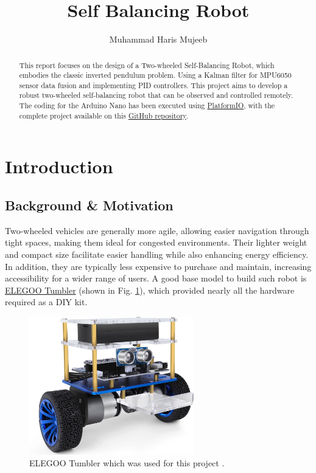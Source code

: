 \documentclass{article}
\title{Self Balancing Robot}
\author{Muhammad Haris Mujeeb}
\begin{document}
\maketitle

\begin{abstract}
This report focuses on the design of a Two-wheeled Self-Balancing Robot, which embodies the classic inverted pendulum problem. Using a Kalman filter for MPU6050 sensor data fusion and implementing PID controllers. This project aims to develop a robust two-wheeled self-balancing robot that can be observed and controlled remotely. The coding for the Arduino Nano has been executed using \href{https://platformio.org/}{PlatformIO}, with the complete project available on this \href{https://github.com/haris-mujeeb/Self-Balancing-Robot}{GitHub repository}.
\end{abstract}

\thispagestyle{empty}
\tableofcontents
\listoffigures
\listoftables
\newpage

\section{Introduction}
\subsection{Background \& Motivation}
Two-wheeled vehicles are generally more agile, allowing easier navigation through tight spaces, making them ideal for congested environments. Their lighter weight and compact size facilitate easier handling while also enhancing energy efficiency. In addition, they are typically less expensive to purchase and maintain, increasing accessibility for a wider range of users.
A good base model to build such robot is \href{https://www.elegoo.com/products/elegoo-tumbller-self-balancing-robot-car}{ELEGOO Tumbler} (shown in Fig. 
\ref{fig:tumbler}), which provided nearly all the hardware required as a DIY kit.
\begin{figure}[h]
    \centering
    \includegraphics[height=6cm]{assets/tumbler.jpg}
    \caption{\label{fig:tumbler} ELEGOO Tumbler which was used for this project \cite{elegoo}.}
\end{figure}
\end{document}
